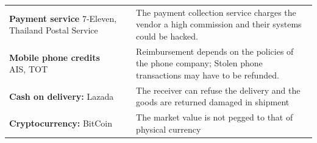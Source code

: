 \documentclass[]{book}
\begin{document}
\begin{longtable}[]{@{}lll@{}}
\begin{minipage}[t]{0.28\columnwidth}\raggedright
\textbf{Payment service} 7-Eleven, Thailand Postal Service\strut
\end{minipage} & \begin{minipage}[t]{0.30\columnwidth}\raggedright
\strut
\end{minipage} & \begin{minipage}[t]{0.34\columnwidth}\raggedright
The payment collection service charges the vendor a high commission and their systems could be hacked.\strut
\end{minipage}\tabularnewline
\begin{minipage}[t]{0.28\columnwidth}\raggedright
\textbf{Mobile phone credits} AIS, TOT\strut
\end{minipage} & \begin{minipage}[t]{0.30\columnwidth}\raggedright
\strut
\end{minipage} & \begin{minipage}[t]{0.34\columnwidth}\raggedright
Reimbursement depends on the policies of the phone company; Stolen phone transactions may have to be refunded.\strut
\end{minipage}\tabularnewline
\begin{minipage}[t]{0.28\columnwidth}\raggedright
\textbf{Cash on delivery:} Lazada\strut
\end{minipage} & \begin{minipage}[t]{0.30\columnwidth}\raggedright
\strut
\end{minipage} & \begin{minipage}[t]{0.34\columnwidth}\raggedright
The receiver can refuse the delivery and the goods are returned damaged in shipment\strut
\end{minipage}\tabularnewline
\begin{minipage}[t]{0.28\columnwidth}\raggedright
\textbf{Cryptocurrency:} BitCoin\strut
\end{minipage} & \begin{minipage}[t]{0.30\columnwidth}\raggedright
\strut
\end{minipage} & \begin{minipage}[t]{0.34\columnwidth}\raggedright
The market value is not pegged to that of physical currency\strut
\end{minipage}\tabularnewline
\bottomrule
\end{longtable}
\end{document}
